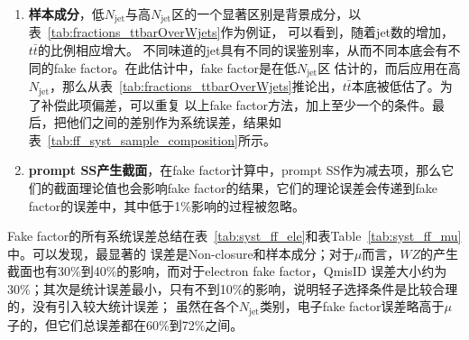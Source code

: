 \begin{enumerate}
  \item \textbf{样本成分}，低$N_{\text{jet}}$与高$N_{\text{jet}}$区的一个显著区别是背景成分，以表~\ref{tab:fractions_ttbarOverWjets}作为例证，
可以看到，随着jet数的增加，$t\bar{t}$的比例相应增大。
不同味道的jet具有不同的误鉴别率，从而不同本底会有不同的fake factor。在此估计中，fake factor是在低$N_{\text{jet}}$区
估计的，而后应用在高$N_{\text{jet}}$，那么从表~\ref{tab:fractions_ttbarOverWjets}推论出，$t\bar{t}$本底被低估了。为了补偿此项偏差，可以重复
以上fake factor方法，加上至少一个\bjet 的条件。最后，把他们之间的差别作为系统误差，结果如表~\ref{tab:ff_syst_sample_composition}所示。



  \item \textbf{prompt SS产生截面}，在fake factor计算中，prompt SS作为减去项，那么它们的截面理论值也会影响fake
factor的结果，它们的理论误差会传递到fake factor的误差中，其中低于1\%影响的过程被忽略。
\end{enumerate}
  Fake factor的所有系统误差总结在表~\ref{tab:syst_ff_ele}和表Table~\ref{tab:syst_ff_mu}中。可以发现，最显著的
误差是Non-closure和样本成分；对于$\mu$而言，$WZ$的产生截面也有30\%到40\%的影响，而对于electron fake factor，QmisID
误差大小约为30\%；其次是统计误差最小，只有不到10\%的影响，说明轻子选择条件是比较合理的，没有引入较大统计误差；
虽然在各个$N_{\text{jet}}$类别，电子fake factor误差略高于$\mu$子的，但它们总误差都在60\%到72\%之间。


